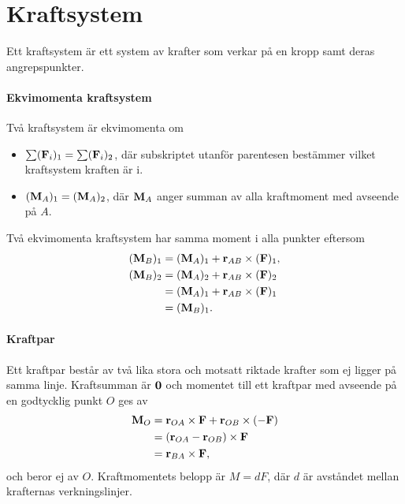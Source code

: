 \section{Kraftsystem}
Ett kraftsystem är ett system av krafter som verkar på en kropp samt deras angrepspunkter.

\paragraph{Ekvimomenta kraftsystem}
Två kraftsystem är ekvimomenta om
\begin{itemize}
	\item $\sum(\vect{F}_i)_1 = \sum(\vect{F}_i)_2$, där subskriptet utanför parentesen bestämmer vilket kraftsystem kraften är i.
	\item $(\vect{M}_A)_1 = (\vect{M}_A)_2$, där $\vect{M}_A$ anger summan av alla kraftmoment med avseende på $A$.
\end{itemize}

Två ekvimomenta kraftsystem har samma moment i alla punkter eftersom
\begin{align*}
	(\vect{M}_B)_1 &= (\vect{M}_A)_1 + \vect{r}_{AB}\times (\vect{F})_1, \\
	(\vect{M}_B)_2 &= (\vect{M}_A)_2 + \vect{r}_{AB}\times (\vect{F})_2 \\
	               &= (\vect{M}_A)_1 + \vect{r}_{AB}\times (\vect{F})_1 \\
	               &= (\vect{M}_B)_1.
\end{align*}

\paragraph{Kraftpar}
Ett kraftpar består av två lika stora och motsatt riktade krafter som ej ligger på samma linje. Kraftsumman är $\vect{0}$ och momentet till ett kraftpar med avseende på en godtycklig punkt $O$ ges av
\begin{align*}
	\vect{M}_O &= \vect{r}_{OA}\times\vect{F} + \vect{r}_{OB}\times (-\vect{F}) \\
	           &= (\vect{r}_{OA}- \vect{r}_{OB})\times\vect{F} \\
	           &= \vect{r}_{BA}\times\vect{F},
\end{align*}
och beror ej av $O$. Kraftmomentets belopp är $M = dF$, där $d$ är avståndet mellan krafternas verkningslinjer.

